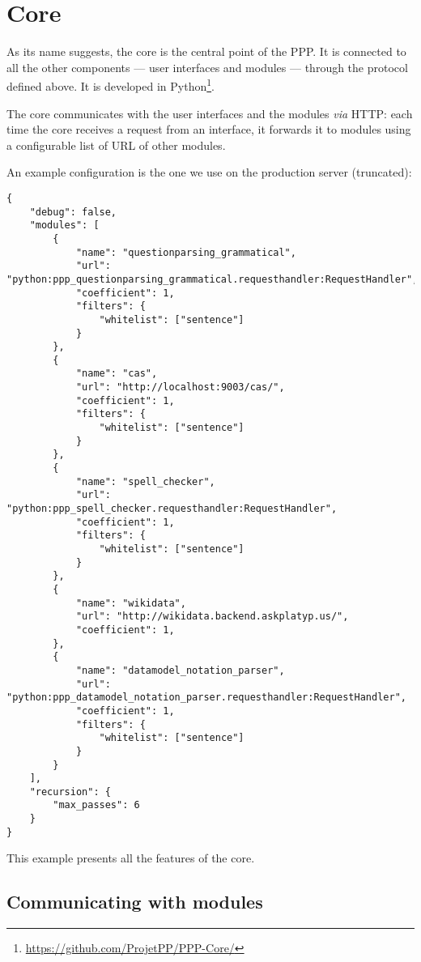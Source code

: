 \section{Core}

As its name suggests, the core is the central point of the PPP. It is
connected to all the other components — user interfaces and modules — through
the protocol defined above. It is developed in Python\footnote{\url{https://github.com/ProjetPP/PPP-Core/}}.

The core communicates with the user interfaces and the modules {\em via} HTTP:
each time the core receives a request from an interface, it forwards it
to modules using a configurable list of URL of other modules.

An example configuration is the one we use on the production server
(truncated):

\begin{verbatim}
{
    "debug": false,
    "modules": [
        {
            "name": "questionparsing_grammatical",
            "url": "python:ppp_questionparsing_grammatical.requesthandler:RequestHandler",
            "coefficient": 1,
            "filters": {
                "whitelist": ["sentence"]
            }
        },
        {
            "name": "cas",
            "url": "http://localhost:9003/cas/",
            "coefficient": 1,
            "filters": {
                "whitelist": ["sentence"]
            }
        },
        {
            "name": "spell_checker",
            "url": "python:ppp_spell_checker.requesthandler:RequestHandler",
            "coefficient": 1,
            "filters": {
                "whitelist": ["sentence"]
            }
        },
        {
            "name": "wikidata",
            "url": "http://wikidata.backend.askplatyp.us/",
            "coefficient": 1,
        },
        {
            "name": "datamodel_notation_parser",
            "url": "python:ppp_datamodel_notation_parser.requesthandler:RequestHandler",
            "coefficient": 1,
            "filters": {
                "whitelist": ["sentence"]
            }
        }
    ],
    "recursion": {
        "max_passes": 6
    }
}
\end{verbatim}

This example presents all the features of the core.

\subsection{Communicating with modules}

